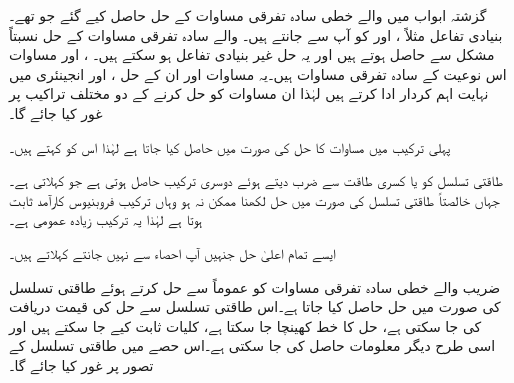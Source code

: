 گزشتہ ابواب میں  والے خطی سادہ تفرقی مساوات کے حل حاصل کیے گئے جو  تھے۔بنیادی تفاعل مثلاً ،  اور  کو آپ  سے جانتے ہیں۔ والے سادہ تفرقی مساوات کے حل نسبتاً مشکل سے حاصل ہوتے ہیں اور یہ حل غیر بنیادی تفاعل ہو سکتے ہیں۔ ،  اور  مساوات اس نوعیت کے سادہ تفرقی مساوات ہیں۔یہ مساوات اور ان کے حل ،  اور  انجینئری میں نہایت اہم کردار ادا کرتے ہیں لہٰذا ان مساوات کو حل کرنے کے دو مختلف تراکیب پر غور کیا جائے گا۔

پہلی ترکیب میں مساوات کا حل   کی صورت میں حاصل کیا جاتا ہے لہٰذا اس کو  کہتے ہیں۔

طاقتی تسلسل کو  یا کسری طاقت  سے ضرب دیتے ہوئے دوسری ترکیب حاصل ہوتی ہے جو  کہلاتی ہے۔جہاں خالصتاً طاقتی تسلسل کی صورت میں حل لکھنا ممکن نہ ہو وہاں ترکیب فروبنیوس کارآمد ثابت ہوتا ہے لہٰذا یہ ترکیب زیادہ عمومی ہے۔

ایسے تمام اعلیٰ حل جنہیں آپ احصاء سے نہیں جانتے   کہلاتے ہیں۔

  ضریب  والے خطی سادہ تفرقی مساوات کو عموماً  سے حل کرتے ہوئے طاقتی تسلسل کی صورت میں حل حاصل کیا جاتا ہے۔اس طاقتی تسلسل سے حل کی قیمت دریافت کی جا سکتی ہے، حل کا خط کھینچا جا سکتا ہے، کلیات ثابت کیے جا سکتے ہیں اور اسی طرح دیگر معلومات حاصل کی جا سکتی ہے۔اس حصے میں طاقتی تسلسل کے تصور پر غور کیا جائے گا۔

